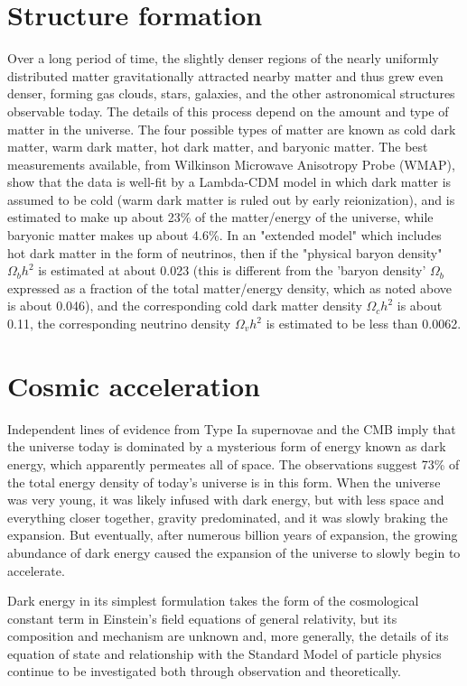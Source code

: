\documentclass[14pt, oneside]{book}
\begin{document}
	\section{Structure formation}
		Over a long period of time, the slightly denser regions of the nearly uniformly distributed matter gravitationally attracted nearby matter and thus grew even denser, forming gas clouds, stars, galaxies, and the other astronomical structures observable today. The details of this process depend on the amount and type of matter in the universe. The four possible types of matter are known as cold dark matter, warm dark matter, hot dark matter, and baryonic matter. The best measurements available, from Wilkinson Microwave Anisotropy Probe (WMAP), show that the data is well-fit by a Lambda-CDM model in which dark matter is assumed to be cold (warm dark matter is ruled out by early reionization), and is estimated to make up about 23\% of the matter/energy of the universe, while baryonic matter makes up about 4.6\%. In an "extended model" which includes hot dark matter in the form of neutrinos, then if the "physical baryon density" $\Omega_{b}h^{2}$ is estimated at about 0.023 (this is different from the 'baryon density' $\Omega_{b}$ expressed as a fraction of the total matter/energy density, which as noted above is about 0.046), and the corresponding cold dark matter density $\Omega_{c}h^{2}$ is about 0.11, the corresponding neutrino density $\Omega_{v}h^{2}$ is estimated to be less than 0.0062. 

	\section{Cosmic acceleration}
		Independent lines of evidence from Type Ia supernovae and the CMB imply that the universe today is dominated by a mysterious form of energy known as dark energy, which apparently permeates all of space. The observations suggest 73\% of the total energy density of today's universe is in this form. When the universe was very young, it was likely infused with dark energy, but with less space and everything closer together, gravity predominated, and it was slowly braking the expansion. But eventually, after numerous billion years of expansion, the growing abundance of dark energy caused the expansion of the universe to slowly begin to accelerate.

		Dark energy in its simplest formulation takes the form of the cosmological constant term in Einstein's field equations of general relativity, but its composition and mechanism are unknown and, more generally, the details of its equation of state and relationship with the Standard Model of particle physics continue to be investigated both through observation and theoretically.
\end{document}
